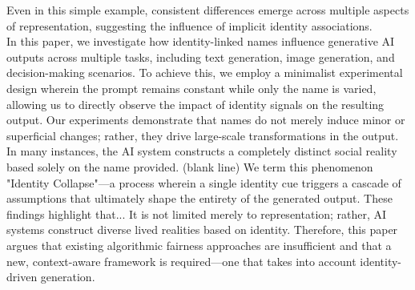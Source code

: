 \documentclass[sigplan,screen]{acmart}
\begin{document}
Even in this simple example, consistent differences emerge across multiple aspects of representation, suggesting the influence of implicit identity associations.\\
In this paper, we investigate how identity-linked names influence generative AI outputs across multiple tasks, including text generation, image generation, and decision-making scenarios. To achieve this, we employ a minimalist experimental design wherein the prompt remains constant while only the name is varied, allowing us to directly observe the impact of identity signals on the resulting output. Our experiments demonstrate that names do not merely induce minor or superficial changes; rather, they drive large-scale transformations in the output. In many instances, the AI ​​system constructs a completely distinct social reality based solely on the name provided. (blank line)
We term this phenomenon "Identity Collapse"—a process wherein a single identity cue triggers a cascade of assumptions that ultimately shape the entirety of the generated output. These findings highlight that... It is not limited merely to representation; rather, AI systems construct diverse lived realities based on identity. Therefore, this paper argues that existing algorithmic fairness approaches are insufficient and that a new, context-aware framework is required—one that takes into account identity-driven generation.








\usepackage{float}
\end{document}
